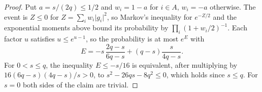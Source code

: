 \begin{proof}
    \leanok
    Put $a=s/(2q)\le1/2$ and $w_i=1-a$ for $i\in A$, $w_i=-a$ otherwise. The
    event is $Z\le0$ for $Z=\sum_iw_i\lvert g_i\rvert^2$, so Markov's
    inequality for $e^{-Z/2}$ and the exponential moments above bound its
    probability by $\prod_i(1+w_i/2)^{-1}$. Each factor $u$ satisfies
    $u\le e^{u-1}$, so the probability is at most $e^E$ with
    \[
        E=-s\,\frac{2q-s}{6q-s}+(q-s)\frac{s}{4q-s}.
    \]
    For $0<s\le q$, the inequality $E\le-s/16$ is equivalent, after
    multiplying by $16(6q-s)(4q-s)/s>0$, to $s^2-26qs-8q^2\le0$, which holds
    since $s\le q$. For $s=0$ both sides of the claim are trivial.
\end{proof}
